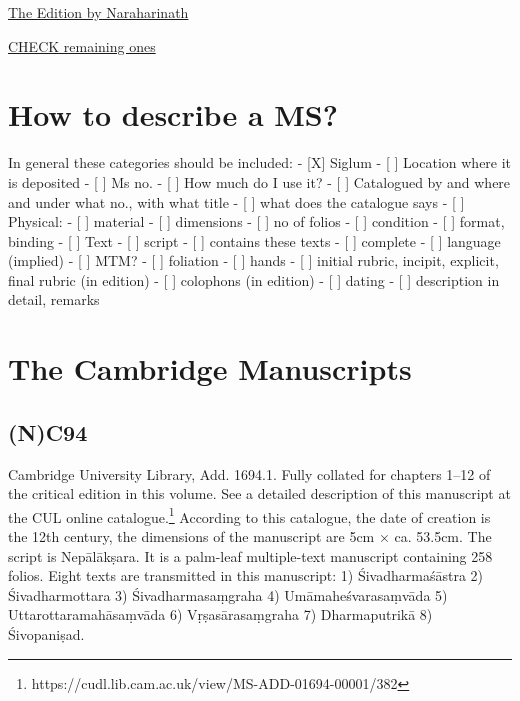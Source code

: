 \documentclass[]{article}
\begin{document}
\href{The\%20Edition\%20by\%20Naraharinath}{The Edition by Naraharinath}

\href{CHECK\%20remaining\%20ones}{CHECK remaining ones}

\hypertarget{how-to-describe-a-ms}{%
\section{How to describe a MS?}\label{how-to-describe-a-ms}}

In general these categories should be included: - {[}X{]} Siglum - {[}
{]} Location where it is deposited - {[} {]} Ms no. - {[} {]} How much
do I use it? - {[} {]} Catalogued by and where and under what no., with
what title - {[} {]} what does the catalogue says - {[} {]} Physical: -
{[} {]} material - {[} {]} dimensions - {[} {]} no of folios - {[} {]}
condition - {[} {]} format, binding - {[} {]} Text - {[} {]} script -
{[} {]} contains these texts - {[} {]} complete - {[} {]} language
(implied) - {[} {]} MTM? - {[} {]} foliation - {[} {]} hands - {[} {]}
initial rubric, incipit, explicit, final rubric (in edition) - {[} {]}
colophons (in edition) - {[} {]} dating - {[} {]} description in detail,
remarks

\hypertarget{the-cambridge-manuscripts}{%
\section{The Cambridge Manuscripts}\label{the-cambridge-manuscripts}}

\hypertarget{nc94}{%
\subsection{(N)C94}\label{nc94}}

Cambridge University Library, Add. 1694.1. Fully collated for chapters
1--12 of the critical edition in this volume. See a detailed description
of this manuscript at the CUL online catalogue.\footnote{https://cudl.lib.cam.ac.uk/view/MS-ADD-01694-00001/382}
According to this catalogue, the date of creation is the 12th century,
the dimensions of the manuscript are 5cm × ca. 53.5cm. The script is
Nepālākṣara. It is a palm-leaf multiple-text manuscript containing 258
folios. Eight texts are transmitted in this manuscript: 1)
Śivadharmaśāstra 2) Śivadharmottara 3) Śivadharmasaṃgraha 4)
Umāmaheśvarasaṃvāda 5) Uttarottaramahāsaṃvāda 6) Vṛṣasārasaṃgraha 7)
Dharmaputrikā 8) Śivopaniṣad.
\end{document}
